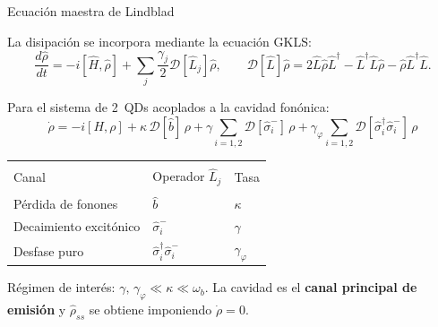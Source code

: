 \documentclass[
11pt,notheorems,hyperref={pdfauthor=whatever}
]{beamer}
\begin{document}
\begin{frame}{Ecuación maestra de Lindblad}
	
	La disipación se incorpora mediante la ecuación GKLS:
	\begin{equation*}
		\frac{d\hat{\rho}}{dt} = -i\left[\hat{H},\hat{\rho}\right]
		+ \sum_j \frac{\gamma_j}{2}\mathcal{D}[\hat{L}_j]\hat{\rho},
		\qquad
		\mathcal{D}[\hat{L}]\hat{\rho} = 2\hat{L}\hat{\rho}\hat{L}^\dagger
		- \hat{L}^\dagger\hat{L}\hat{\rho}
		- \hat{\rho}\hat{L}^\dagger\hat{L}.
	\end{equation*}
	
	\vspace{4pt}
	Para el sistema de 2~QDs acoplados a la cavidad fonónica:
	\begin{equation*}
		\dot{\rho} = -i[H,\rho]
		+ \kappa\,\mathcal{D}[\hat{b}]\,\rho
		+ \gamma\sum_{i=1,2}\mathcal{D}[\hat{\sigma}_i^-]\,\rho
		+ \gamma_\varphi\sum_{i=1,2}\mathcal{D}[\hat{\sigma}_i^\dagger\hat{\sigma}_i^-]\,\rho
	\end{equation*}
	
	\vspace{2pt}
	\begin{center}
		\begin{tabular}{lll}
			\hline\\[-8pt]
			Canal & Operador $\hat{L}_j$ & Tasa \\[2pt]
			\hline\\[-6pt]
			Pérdida de fonones      & $\hat{b}$                                    & $\kappa$ \\[4pt]
			Decaimiento excitónico  & $\hat{\sigma}_i^-$                           & $\gamma$ \\[4pt]
			Desfase puro            & $\hat{\sigma}_i^\dagger\hat{\sigma}_i^-$     & $\gamma_\varphi$ \\[4pt]
			\hline
		\end{tabular}
	\end{center}
	
	\vspace{6pt}
	Régimen de interés: $\gamma,\,\gamma_\varphi \ll \kappa \ll \omega_b$.
	La cavidad es el \textbf{canal principal de emisión} y
	$\hat{\rho}_{ss}$ se obtiene imponiendo $\dot{\rho}=0$.
	
\end{frame}
\end{document}
